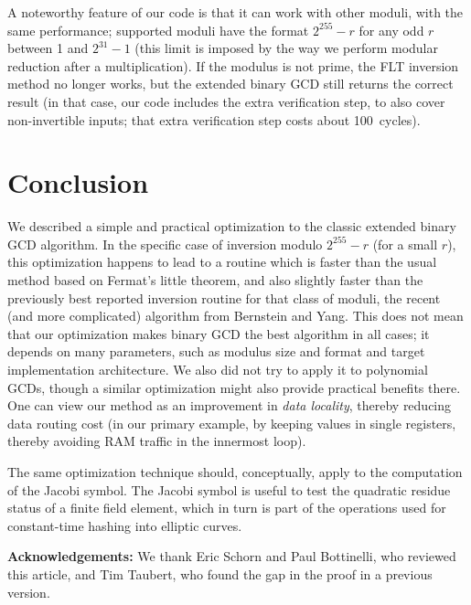 \documentclass{llncs}
\begin{document}
A noteworthy feature of our code is that it can work with other moduli,
with the same performance; supported moduli have the format $2^{255}-r$
for any odd $r$ between 1 and $2^{31}-1$ (this limit is imposed by the
way we perform modular reduction after a multiplication). If the modulus
is not prime, the FLT inversion method no longer works, but the extended
binary GCD still returns the correct result (in that case, our code
includes the extra verification step, to also cover non-invertible inputs;
that extra verification step costs about 100~cycles).

\section{Conclusion}

We described a simple and practical optimization to the classic extended
binary GCD algorithm. In the specific case of inversion modulo
$2^{255}-r$ (for a small $r$), this optimization happens to lead to a
routine which is faster than the usual method based on Fermat's little
theorem, and also slightly faster than the previously best reported
inversion routine for that class of moduli, the recent (and more
complicated) algorithm from Bernstein and Yang. This does not mean that
our optimization makes binary GCD the best algorithm in all cases; it
depends on many parameters, such as modulus size and format and target
implementation architecture. We also did not try to apply it to
polynomial GCDs, though a similar optimization might also provide
practical benefits there. One can view our method as an improvement in
\emph{data locality}, thereby reducing data routing cost (in our primary
example, by keeping values in single registers, thereby avoiding RAM
traffic in the innermost loop).

The same optimization technique should, conceptually, apply to the
computation of the Jacobi symbol\cite{Coh1993}. The Jacobi symbol
is useful to test the quadratic residue status of a finite field element,
which in turn is part of the operations used for constant-time hashing
into elliptic curves\cite{DraftHashToCurve09}.

\vspace{2ex}
\noindent\textsf{\textbf{Acknowledgements:}} We thank Eric Schorn
and Paul Bottinelli, who reviewed this article, and Tim Taubert,
who found the gap in the proof in a previous version.
\end{document}

